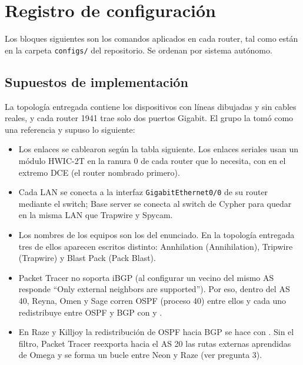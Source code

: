 \section{Registro de configuración}

Los bloques siguientes son los comandos aplicados en cada router, tal como están en la carpeta \texttt{configs/} del repositorio.
Se ordenan por sistema autónomo.

\subsection*{Supuestos de implementación}

La topología entregada contiene los dispositivos con líneas dibujadas y sin cables reales, y cada router 1941 trae solo dos puertos Gigabit. El grupo la tomó como una referencia y supuso lo siguiente:
\begin{itemize}[nosep]
  \item Los enlaces se cablearon según la tabla siguiente. Los enlaces seriales usan un módulo HWIC-2T en la ranura 0 de cada router que lo necesita, con  en el extremo DCE (el router nombrado primero).
  \item Cada LAN se conecta a la interfaz \texttt{GigabitEthernet0/0} de su router mediante el switch; Base server se conecta al switch de Cypher para quedar en la misma LAN que Trapwire y Spycam.
  \item Los nombres de los equipos son los del enunciado. En la topología entregada tres de ellos aparecen escritos distinto: Annhilation (Annihilation), Tripwire (Trapwire) y Blast Pack (Pack Blast).
  \item Packet Tracer no soporta iBGP (al configurar un vecino del mismo AS responde ``Only external neighbors are supported''). Por eso, dentro del AS 40, Reyna, Omen y Sage corren OSPF (proceso 40) entre ellos y cada uno redistribuye entre OSPF y BGP con  y .
  \item En Raze y Killjoy la redistribución de OSPF hacia BGP se hace con . Sin el filtro, Packet Tracer reexporta hacia el AS 20 las rutas externas aprendidas de Omega y se forma un bucle entre Neon y Raze (ver pregunta 3).
\end{itemize}

\begin{center}\footnotesize

\end{center}

